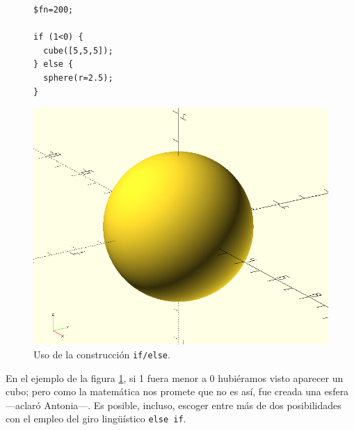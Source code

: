   \begin{figure}[ht]
\begin{minipage}[]{.5\textwidth}%
\begin{lstlisting}
$fn=200;

if (1<0) {
  cube([5,5,5]);
} else {
  sphere(r=2.5);
}
\end{lstlisting}%

\end{minipage}
\begin{minipage}[]{.49\textwidth}%

  \centering
  \includegraphics[width=.7\textwidth]{imagenes/if-2}
      \end{minipage}
      \caption{Uso de la construcción \lstinline!if/else!.}
      \label{fig:if-2}
\end{figure}


\guillemotright En el ejemplo de la figura \ref{fig:if-2}, si 1 fuera
menor a 0 hubiéramos visto aparecer un cubo; pero como la matemática
nos promete que no es así, fue creada una esfera ---aclaró
Antonia---. Es posible, incluso, escoger entre más de dos
posibilidades con el empleo del giro lingüístico \lstinline!else if!.

